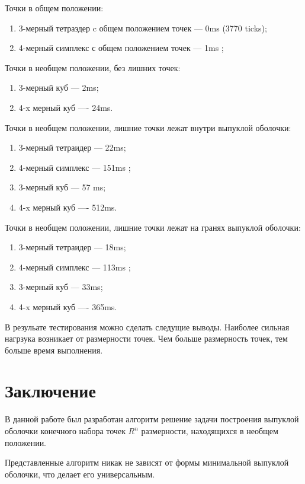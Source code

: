 \documentclass[14pt]{extarticle}
\begin{document}
Точки в общем положении:
\begin{enumerate}[topsep=-0.5\parsep,itemsep=-0.5\parsep]
  \item 3-мерный тетраэдер c общем положением точек --- 0ms (3770 ticks);
  \item 4-мерный симплекс с общем положением точек --- 1ms ;
\end{enumerate}
\medskip
Точки в необщем положении, без лишних точек:
\begin{enumerate}[topsep=-0.5\parsep,itemsep=-0.5\parsep]
        \item 3-мерный куб  --- 2ms;
        \item 4-x мерный куб ---- 24ms.
\end{enumerate}
\medskip
Точки в необщем положении, лишние точки лежат внутри выпуклой оболочки:
\begin{enumerate}[topsep=-0.5\parsep,itemsep=-0.5\parsep]
        \item 3-мерный тетраидер --- 22ms;
        \item 4-мерный симплекс  --- 151ms ;
        \item 3-мерный куб  --- 57 ms;
        \item 4-x мерный куб ---- 512ms.
\end{enumerate}
Точки в необщем положении, лишние точки лежат на гранях выпуклой оболочки:
\begin{enumerate}[topsep=-0.5\parsep,itemsep=-0.5\parsep]
        \item 3-мерный тетраидер --- 18ms;
        \item 4-мерный симплекс  --- 113ms ;
        \item 3-мерный куб  --- 33ms;
        \item 4-x мерный куб ---- 365ms.
\end{enumerate}
\medskip

В резульате тестирования можно сделать следущие выводы.
Наиболее сильная нагрзука возникает от размерности точек. Чем больше размерность точек, тем больше время выполнения.
\newpage


\section*{Заключение}
В данной работе был разработан алгоритм решение задачи построения выпуклой оболочки конечного набора точек $R^n$ размерности, находящихся в необщем положении.

Представленные алгоритм никак не зависят от формы
минимальной выпуклой оболочки, что делает его универсальным.
\end{document}
